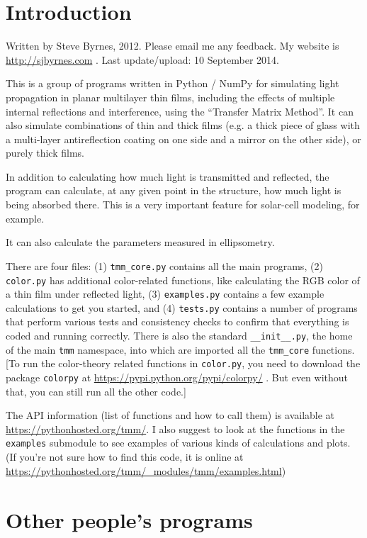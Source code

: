 \documentclass[12pt]{article}
\renewcommand{\(}{\left(}
\renewcommand{\)}{\right)}
\begin{document}
\section{Introduction}

Written by Steve Byrnes, 2012. Please email me any feedback. My website is \url{http://sjbyrnes.com} . Last update/upload: 10 September 2014.

This is a group of programs written in Python / NumPy for simulating light propagation in planar multilayer thin films, including the effects of multiple internal reflections and interference, using the ``Transfer Matrix Method''. It can also simulate combinations of thin and thick films (e.g. a thick piece of glass with a multi-layer antireflection coating on one side and a mirror on the other side), or purely thick films.

In addition to calculating how much light is transmitted and reflected, the program can calculate, at any given point in the structure, how much light is being absorbed there. This is a very important feature for solar-cell modeling, for example.

It can also calculate the parameters measured in ellipsometry.

There are four files: (1) \verb=tmm_core.py= contains all the main programs, (2) \verb=color.py= has additional color-related functions, like calculating the RGB color of a thin film under reflected light, (3) \verb=examples.py= contains a few example calculations to get you started, and (4) \verb=tests.py= contains a number of programs that perform various tests and consistency checks to confirm that everything is coded and running correctly. There is also the standard \verb=__init__.py=, the home of the main \verb=tmm= namespace, into which are imported all the \verb=tmm_core= functions. [To run the color-theory related functions in \verb=color.py=, you need to download the package \verb=colorpy= at \url{https://pypi.python.org/pypi/colorpy/} . But even without that, you can still run all the other code.]

The API information (list of functions and how to call them) is available at \url{https://pythonhosted.org/tmm/}. I also suggest to look at the functions in the \verb=examples= submodule to see examples of various kinds of calculations and plots. (If you're not sure how to find this code, it is online at \url{https://pythonhosted.org/tmm/_modules/tmm/examples.html})

\section{Other people's programs}
\end{document}
